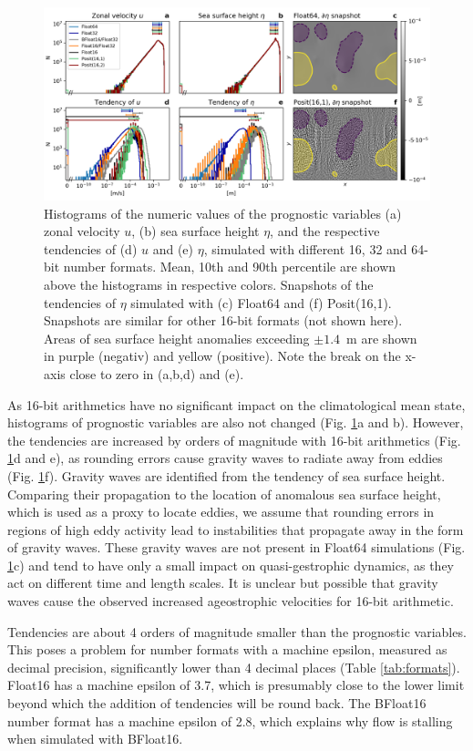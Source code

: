 \documentclass[draft]{agujournal2019}
\begin{document}
\begin{figure}
\includegraphics[width=1\textwidth]{tendency_hist.png}
\caption{Histograms of the numeric values of the prognostic variables (a) zonal
velocity $u$, (b) sea surface height $\eta$, and the respective tendencies of
(d) $u$ and (e) $\eta$, simulated with different 16, 32 and 64-bit number formats.
Mean, 10th and 90th percentile are shown above the histograms in respective colors.
Snapshots of the tendencies of $\eta$ simulated with (c) Float64 and (f) Posit(16,1).
Snapshots are similar for other 16-bit formats (not shown here). Areas of sea
surface height anomalies exceeding $\pm1.4$~m are shown in purple (negativ) and
yellow (positive). Note the break on the x-axis close to zero in (a,b,d) and (e).}
\label{fig:tend}
\end{figure}

As 16-bit arithmetics have no significant impact on the climatological mean state,
histograms of prognostic variables are also not changed (Fig. \ref{fig:tend}a and b).
However, the tendencies are increased by orders of magnitude with 16-bit arithmetics
(Fig. \ref{fig:tend}d and e), as rounding errors cause gravity waves to radiate
away from eddies (Fig. \ref{fig:tend}f). Gravity waves are identified from the
tendency of sea surface height. Comparing their propagation to the location of
anomalous sea surface height, which is used as a proxy to locate eddies, we
assume that rounding errors in regions of high eddy activity lead to instabilities
that propagate away in the form of gravity waves. These gravity waves are not
present in Float64 simulations (Fig. \ref{fig:tend}c) and tend to have only a
small impact on quasi-gestrophic dynamics, as they act on different time and
length scales. It is unclear but possible that gravity waves cause the observed
increased ageostrophic velocities for 16-bit arithmetic.

Tendencies are about 4 orders of magnitude smaller than the prognostic variables.
This poses a problem for number formats with a machine epsilon, measured as decimal
precision, significantly lower than 4 decimal places (Table \ref{tab:formats}).
Float16 has a machine epsilon of 3.7, which is presumably close to the lower limit
beyond which the addition of tendencies will be round back. The BFloat16 number
format has a machine epsilon of 2.8, which explains why flow is stalling when
simulated with BFloat16.
\end{document}
